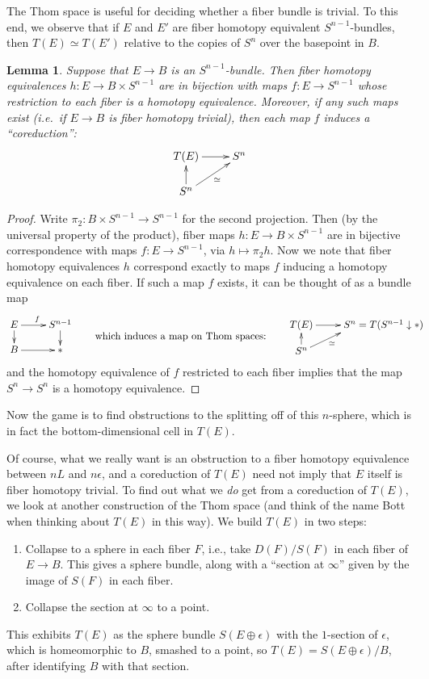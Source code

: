 \documentclass{article}
\renewcommand{\to}{\longrightarrow}
\renewcommand{\mapsto}{\longmapsto}
\newtheorem{lem}[thm]{Lemma}
\theoremstyle{definition}
\begin{document}
The Thom space is useful for deciding whether a fiber bundle is trivial.  To this end, we observe that if $E$ and $E'$ are fiber homotopy equivalent $S^{n-1}$-bundles, then $T(E) \simeq T(E')$ relative to the copies of $S^n$ over the basepoint in $B$.
\begin{lem}\label{LemOnFHTrivialisations}
Suppose that $E \to B$ is an $S^{n-1}$-bundle. Then fiber homotopy equivalences $h:E\to B\times S^{n-1}$ are in bijection with maps $f:E\to S^{n-1}$ whose restriction to each fiber is a homotopy equivalence. Moreover, if any such maps exist (i.e.\ if $E\to B$ is fiber homotopy trivial), then each map $f$ induces a ``coreduction'':
\[\xymatrix@R=.6cm{
T(E)\ar[r]&S^n\\
S^n\ar[u]\ar[ur]_\simeq
}\]
\end{lem}
\begin{proof}
Write $\pi_2:B\times S^{n-1}\to S^{n-1}$ for the second projection. Then (by the universal property of the product), fiber maps $h:E\to B\times S^{n-1}$ are in bijective correspondence with maps $f:E\to S^{n-1}$, via $h\mapsto \pi_2h$. Now we note that fiber homotopy equivalences $h$ correspond exactly to maps $f$ inducing a homotopy equivalence on each fiber. If such a map $f$ exists, it can be thought of as a bundle map
\[\xymatrix@R=.4cm{
E\ar[r]^f\ar[d]& S^{n-1}\ar[d]\\
B\ar[r]&\ast
}\raisebox{-.4cm}{\textup{\qquad which induces a map on Thom spaces:\qquad}}
\xymatrix@R=.4cm{
T(E)\ar[r]&S^n=\makebox[0cm][l]{$T(S^{n-1}\downarrow*)$}\\
S^n\ar[u]\ar[ur]_\simeq
}\qquad\qquad\]
and the homotopy equivalence of $f$ restricted to each fiber implies that the map $S^n\to S^n$ is a homotopy equivalence.
\end{proof}
\noindent Now the game is to find obstructions to the splitting off of this $n$-sphere, which is in fact the bottom-dimensional cell in $T(E)$.

Of course, what we really want is an obstruction to a fiber homotopy equivalence between $nL$ and $n \epsilon$, and a coreduction of $T(E)$ need not imply that $E$ itself is fiber homotopy trivial.  To find out what we \emph{do} get from a coreduction of $T(E)$, we look at another construction of the Thom space (and think of the name Bott when thinking about $T(E)$ in this way).  We build $T(E)$ in two steps:
\begin{enumerate}
\item Collapse to a sphere in each fiber $F$, i.e., take $D(F) / S(F)$ in each fiber of $E \to B$.  This gives a sphere bundle, along with a ``section at $\infty$'' given by the image of $S(F)$ in each fiber.
\item Collapse the section at $\infty$ to a point.
\end{enumerate}
This exhibits $T(E)$ as the sphere bundle $S(E \oplus \epsilon)$ with the $1$-section of $\epsilon$, which is homeomorphic to $B$, smashed to a point, so $T(E) = S(E \oplus \epsilon) / B$, after identifying $B$ with that section. %
\end{document}
